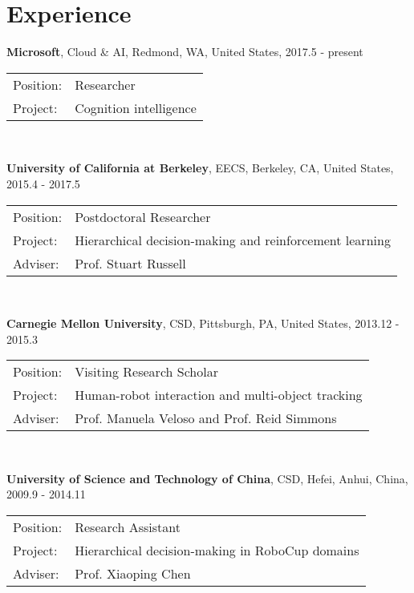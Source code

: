 \documentclass[letterpaper,10pt]{article}
\renewenvironment{itemize}{
  \begin{list}{}{
    \setlength{\leftmargin}{1.5em}
  }
}{
  \end{list}
}
\begin{document}
\section*{Experience}
\begin{itemize}
	\item \textbf{Microsoft}, Cloud \& AI, Redmond, WA, United States, 2017.5 - present \\
	      \begin{tabular}{ll}
		      Position: & Researcher             \\
		      Project:  & Cognition intelligence \\
	      \end{tabular} \\
	\item \textbf{University of California at Berkeley}, EECS, Berkeley, CA, United States, 2015.4 - 2017.5 \\
	      \begin{tabular}{ll}
		      Position: & Postdoctoral Researcher                                 \\
		      Project:  & Hierarchical decision-making and reinforcement learning \\
		      Adviser:  & Prof. Stuart Russell                                    \\
	      \end{tabular} \\
	\item \textbf{Carnegie Mellon University}, CSD, Pittsburgh, PA, United States, 2013.12 - 2015.3 \\
	      \begin{tabular}{ll}
		      Position: & Visiting Research Scholar                         \\
		      Project:  & Human-robot interaction and multi-object tracking \\
		      Adviser:  & Prof. Manuela Veloso and Prof. Reid Simmons       \\
	      \end{tabular} \\
	\item \textbf{University of Science and Technology of China}, CSD, Hefei, Anhui, China, 2009.9 - 2014.11 \\
	      \begin{tabular}{ll}
		      Position: & Research Assistant                              \\
		      Project:  & Hierarchical decision-making in RoboCup domains \\
		      Adviser:  & Prof. Xiaoping Chen                             \\
	      \end{tabular} \\
\end{itemize}
\end{document}
